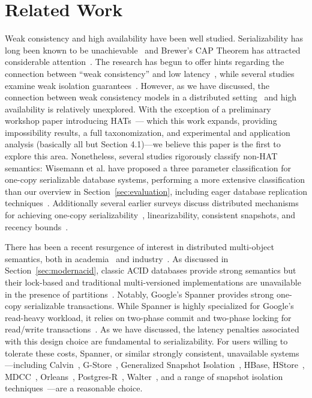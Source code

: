 
\section{Related Work}

Weak consistency and high availability have been well
studied. Serializability has long been known to be
unachievable~\cite{davidson-survey} and Brewer's CAP Theorem has
attracted considerable attention~\cite{gilbert-cap}. The research has
begun to offer hints regarding the connection between ``weak
consistency'' and low latency~\cite{abadi-pacelc}, while several
studies examine weak isolation guarantees~\cite{adya,
  ansicritique}. However, as we have discussed, the connection between
weak consistency models in a distributed setting~\cite{calm, crdt} and
high availability is relatively unexplored. With the exception of a
preliminary workshop paper introducing HATs~\cite{hat-hotos}--- which
this work expands, providing impossibility results, a full
taxonomization, and experimental and application analysis (basically
all but Section 4.1)---we believe this paper is the first to explore
this area. Nonetheless, several studies rigorously classify non-HAT
semantics: Wisemann et al. have proposed a three parameter
classification for one-copy serializable database systems, performing
a more extensive classification than our overview in
Section~\ref{sec:evaluation}, including eager database replication
techniques~\cite{kemme-classification}. Additionally several earlier
surveys discuss distributed mechanisms for achieving one-copy
serializability~\cite{wisemann-survey}, linearizability, consistent
snapshots, and recency bounds~\cite{ceri-mechanism, chen-mechanism}.

There has been a recent resurgence of interest in distributed
multi-object semantics, both in academia~\cite{kraska-s3, granola,
  gstore, mdcc, eiger, walter,calvin, swift} and
industry~\cite{orleans, spanner}. As discussed in
Section~\ref{sec:modernacid}, classic ACID databases provide strong
semantics but their lock-based and traditional multi-versioned
implementations are unavailable in the presence of
partitions~\cite{bernstein-book, gray-isolation}. Notably, Google's
Spanner provides strong one-copy serializable transactions. While
Spanner is highly specialized for Google's read-heavy workload, it
relies on two-phase commit and two-phase locking for read/write
transactions~\cite{spanner}. As we have discussed, the latency
penalties associated with this design choice are fundamental to
serializability. For users willing to tolerate these costs, Spanner,
or similar strongly consistent, unavailable systems---including
Calvin~\cite{calvin}, G-Store~\cite{gstore}, Generalized Snapshot
Isolation~\cite{generalizedsnapshot}, HBase, HStore~\cite{hstore},
MDCC~\cite{mdcc}, Orleans~\cite{orleans},
Postgres-R~\cite{kemme-thesis}, Walter~\cite{walter}, and a range of
snapshot isolation techniques~\cite{middleware-db, kemme-snapshot,
  daudjee-snapshot}---are a reasonable choice.

